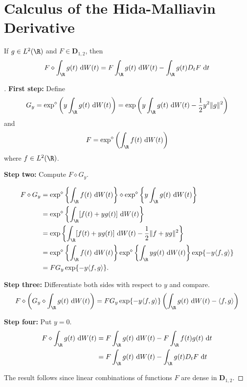 %

  \section{Calculus of the Hida-Malliavin Derivative}

  \begin{theorem}\label{thm:202406071706}
    If $g \in L^2(\R)$ and $F \in \mathbf{D}_{1,2}$, then 
    \[
      F \diamond \int_\R g(t) ~\mathrm{d}W(t) = F \int_\R g(t) ~\mathrm{d}W(t) - \int_\R g(t) D_t F ~\mathrm{d}t
    \]
  \end{theorem}

  \begin{proof}[]
    \textbf{First step:} Define 
    \[
      G_y = \exp^\diamond \left( y \int_\R g(t) ~\mathrm{d}W(t) \right) = \exp \left( y \int_\R g(t) ~\mathrm{d}W(t) - \frac{1}{2} y^2 \| g\|^2 \right)
    \]
    and 
    \[
      F = \exp^\diamond \left( \int_\R f(t) ~\mathrm{d}W(t) \right)
    \]
    where $f \in L^2(\R)$. 

  \textbf{Step two:} Compute $F \diamond G_y$.

\begin{equation*}
\begin{aligned}
  F \diamond G_y & =\exp ^{\diamond}\left\{\int_{\R} f(t) ~\mathrm{d} W(t)\right\} \diamond \exp ^{\diamond}\left\{y \int_{\R} g(t) ~\mathrm{d} W(t)\right\} \\
& =\exp ^{\diamond}\left\{\int_{\R}[f(t)+y g(t)] ~\mathrm{d} W(t)\right\} \\
& =\exp \left\{\int_{\R}[f(t)+y g(t)] ~\mathrm{d} W(t)-\frac{1}{2}\|f+y g\|^2\right\} \\
& =\exp ^{\diamond}\left\{\int_{\R} f(t) ~\mathrm{d} W(t)\right\} \exp ^{\diamond}\left\{\int_{\R} y g(t) ~\mathrm{d} W(t)\right\} \exp \{-y \langle f, g \rangle \} \\
& =F G_y \exp \{-y \langle f, g \rangle \} .
\end{aligned}
\end{equation*}

  \textbf{Step three:} Differentiate both sides with respect to $y$ and compare. 
  \[
    F \diamond \left( G_y \diamond \int_\R g(t) ~\mathrm{d}W(t) \right) = F G_y \exp \{-y \langle f, g \rangle \} \left( \int_\R g(t) ~\mathrm{d}W(t) - \langle f, g \rangle \right)
  \]

  \textbf{Step four:} Put $y = 0$. 
  \begin{equation*}
    \begin{aligned}
      F \diamond \int_\R g(t) ~\mathrm{d} W(t) &= F \int_\R g(t) ~\mathrm{d}W(t) - F \int_\R f(t) g(t) ~\mathrm{d}t \\
                                               &= F \int_\R g(t) ~\mathrm{d}W(t) - \int_\R g(t) D_t F ~\mathrm{d}t
    \end{aligned}
    \label{eq:202405091635}
  \end{equation*}

    The result follows since linear combinations of functions $F$ are dense in $\mathbf{D}_{1,2}$. 
  \end{proof}

